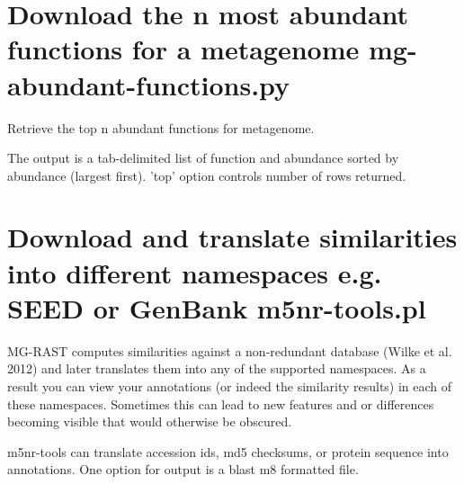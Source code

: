\documentclass[letterpaper,10pt,english]{sphinxmanual}
\begin{document}
\section{Download the n most abundant functions for a metagenome \textendash{} mg-abundant-functions.py}
\label{\detokenize{api:download-the-n-most-abundant-functions-for-a-metagenome-mg-abundant-functions-py}}
Retrieve the top n abundant functions for metagenome.

The output is a tab-delimited list of function and abundance sorted by
abundance (largest first). ’top’ option controls number of rows
returned.


\begin{sphinxVerbatim}[commandchars=\\\{\}]
          
\end{sphinxVerbatim}


\section{Download and translate similarities into different namespaces e.g. SEED or GenBank \textendash{} m5nr-tools.pl}
\label{\detokenize{api:download-and-translate-similarities-into-different-namespaces-e-g-seed-or-genbank-m5nr-tools-pl}}
MG-RAST computes similarities against a non-redundant database (Wilke et
al. 2012) and later translates them into any of the supported
namespaces. As a result you can view your annotations (or indeed the
similarity results) in each of these namespaces. Sometimes this can lead
to new features and or differences becoming visible that would otherwise
be obscured.

m5nr-tools can translate accession ids, md5 checksums, or protein
sequence into annotations. One option for output is a blast m8 formatted
file.


\begin{sphinxVerbatim}[commandchars=\\\{\}]
        
\end{sphinxVerbatim}
\end{document}
